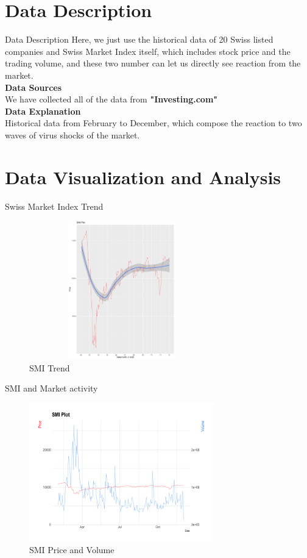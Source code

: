 \documentclass{beamer}
\begin{document}
\section{Data Description}
\begin{frame}{Data Description}
Here, we just use the historical data of 20 Swiss listed companies and Swiss Market Index itself, which includes stock price and the trading volume, and these two number can let us directly see reaction from the market.\\ 
\textbf{Data Sources}\\
We have collected all of the data from \textbf{"Investing.com"}\\
\textbf{Data Explanation} \\
Historical data from February to December, which compose the reaction to two waves of virus shocks of the market.
\end{frame}
\section{Data Visualization and Analysis}
\begin{frame}{Swiss Market Index Trend}
\begin{figure}
    \centering
    \includegraphics[width = 8cm, height = 6cm]{SMI plot.pdf}
    \caption{SMI Trend}
    \label{fig:mylabel1}
\end{figure}
\end{frame}

\begin{frame}{SMI and Market activity }
\begin{figure}
    \centering
    \includegraphics[width = 8cm, height = 6cm]{Rplot.png}
    \caption{SMI Price and Volume}
    \label{fig:mylabel2}
\end{figure}
    
\end{frame}
\end{document}
